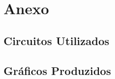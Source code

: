 \newpage
\section{Anexo}
    \listoffigures
    \newpage
    
    \subsection{Circuitos Utilizados}
        

    \subsection{Gráficos Produzidos}
        